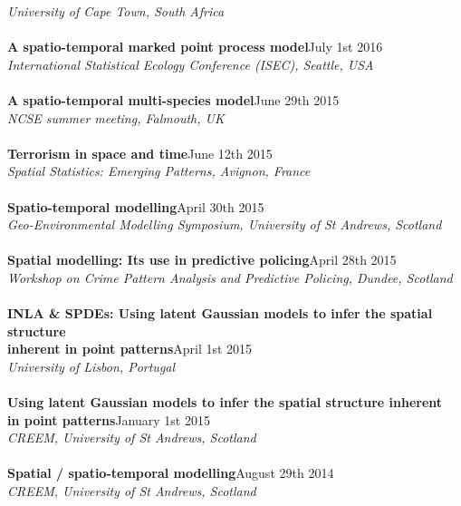 \documentclass[10pt,letter]{article}
\begin{document}
 {\sl University of Cape Town, South Africa}\\
\hdashrule[0.5ex]{4cm}{1pt}{1pt}\\
{\textbf{A spatio-temporal marked point process model}}\hfill July 1st 2016\\
 {\sl International Statistical Ecology Conference (ISEC), Seattle, USA}\\
  \hdashrule[0.5ex]{4cm}{1pt}{1pt}\\
 {\textbf{A spatio-temporal multi-species model}}\hfill June 29th 2015\\
 {\sl NCSE summer meeting, Falmouth, UK}\\
 \hdashrule[0.5ex]{4cm}{1pt}{1pt}\\
{\textbf{Terrorism in space and time}}\hfill June 12th 2015\\
 {\sl Spatial Statistics: Emerging Patterns, Avignon, France}\\
 \hdashrule[0.5ex]{4cm}{1pt}{1pt}\\
 {\textbf{Spatio-temporal modelling}}\hfill April 30th 2015\\
 {\sl Geo-Environmental Modelling Symposium, University of St Andrews, Scotland}\\
 \hdashrule[0.5ex]{4cm}{1pt}{1pt}\\
 \noindent
{\textbf{Spatial modelling: Its use in predictive policing}}\hfill April 28th 2015\\
{\sl Workshop on Crime Pattern Analysis and Predictive Policing, Dundee, Scotland}\\
\hdashrule[0.5ex]{4cm}{1pt}{1pt}\\
{\textbf{INLA \& SPDEs: Using latent Gaussian models to infer the spatial structure \\
inherent in point patterns}}\hfill April 1st 2015\\
 {\sl University of Lisbon, Portugal}\\
 \hdashrule[0.5ex]{4cm}{1pt}{1pt}\\
 {\textbf{Using latent Gaussian models to infer the spatial
structure inherent \\in point patterns}}\hfill January 1st 2015\\
 {\sl CREEM, University of St Andrews, Scotland}\\
 \hdashrule[0.5ex]{4cm}{1pt}{1pt}\\
 {\textbf{Spatial / spatio-temporal modelling}}\hfill August 29th 2014\\
 {\sl CREEM, University of St Andrews, Scotland}\\
\end{document}
